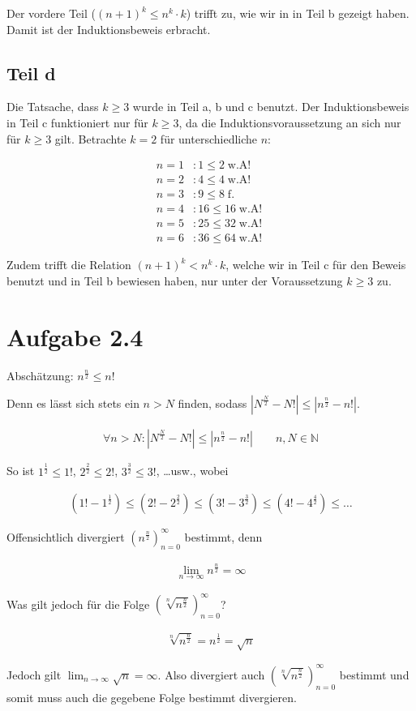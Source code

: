 \documentclass[a4paper,german,12pt,smallheadings]{scrartcl}
\begin{document}
Der vordere Teil ($(n+1)^k \le n^k \cdot k$) trifft zu, wie wir in in Teil b gezeigt haben. Damit ist der Induktionsbeweis erbracht.
\subsection*{Teil d}

Die Tatsache, dass $k \ge 3$ wurde in Teil a, b und c benutzt. Der
Induktionsbeweis in Teil c funktioniert nur für $k \ge 3$, da die
Induktionsvoraussetzung an sich nur für $k \ge 3$ gilt. Betrachte $k=2$ für
unterschiedliche $n$:

\begin{align*}
  n=1&: 1 \le 2 \operatorname{w.A!}\\
  n=2&: 4 \le 4 \operatorname{w.A!}\\
  n=3&: 9 \le 8 \operatorname{f.}\\
  n=4&: 16 \le 16 \operatorname{w.A!}\\
  n=5&: 25 \le 32 \operatorname{w.A!}\\
  n=6&: 36 \le 64 \operatorname{w.A!}
\end{align*}

Zudem trifft die Relation $(n+1)^k < n^k \cdot k$, welche wir in Teil c für den Beweis benutzt und in Teil b bewiesen haben, nur unter der Voraussetzung $k \ge 3$ zu.

\section*{Aufgabe 2.4}
Abschätzung: $n^\frac{n}{2} \le n!$

Denn es lässt sich stets ein $n > N$ finden, sodass $|N^{\frac{N}{2}} - N!| \le
|n^\frac{n}{2} - n!|$.

\begin{align*}
  \forall n > N: |N^\frac{N}{2} - N!| \le |n^\frac{n}{2} - n!| \qquad n,N \in \mathbb{N}
\end{align*}

So ist $1^\frac{1}{2} \le 1!$, $2^{\frac{2}{2}} \le 2!$, $3^\frac{3}{2} \le 3!$, \dots usw., wobei

\begin{align*}
  (1! - 1^{\frac{1}{2}}) \le (2! - 2^{\frac{2}{2}}) \le (3! - 3^{\frac{3}{2}}) \le (4! - 4^{\frac{4}{2}}) \le \dots
\end{align*}

Offensichtlich divergiert $\left(n^\frac{n}{2}\right)_{n=0}^{\infty}$ bestimmt, denn

\begin{align*}
  \lim_{n \to \infty} n^\frac{n}{2} = \infty
\end{align*}

Was gilt jedoch für die Folge $\left( \sqrt[n]{n^\frac{n}{2}} \right)_{n=0}^{\infty}$?

\begin{align*}
  \sqrt[n]{n^{\frac{n}{2}}} = n^\frac{1}{2} = \sqrt{n}
\end{align*}

Jedoch gilt $\lim_{n \to \infty} \sqrt{n} = \infty$. Also divergiert auch
$\left( \sqrt[n]{n^{\frac{n}{2}}} \right)_{n=0}^{\infty}$ bestimmt und somit
muss auch die gegebene Folge bestimmt divergieren.
\end{document}
